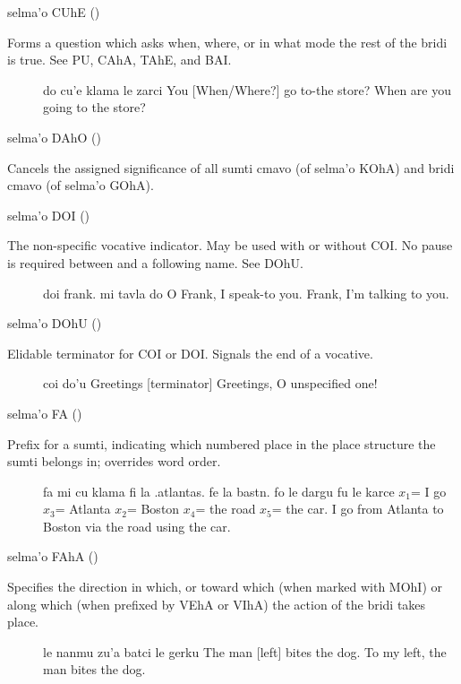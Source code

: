 selma'o CUhE () 

Forms a question which asks when, where, or in what mode the
    rest of the bridi is true. See PU, CAhA, TAhE, and BAI.
\begin{description}
\item[] do cu'e klama le zarci You [When/Where?] go to-the store? When are you going to the store?
\end{description}

selma'o DAhO () 

Cancels the assigned significance of all sumti cmavo (of
    selma'o KOhA) and bridi cmavo (of selma'o GOhA).

selma'o DOI ()

The non-specific vocative indicator. May be used with or
    without COI. No pause is required between  and a
    following name. See DOhU.
\begin{description}
\item[] doi frank. mi tavla do O Frank, I speak-to you. Frank, I'm talking to you.
\end{description}

selma'o DOhU () 

Elidable terminator for COI or DOI. Signals the end of a
    vocative.
\begin{description}
\item[] coi do'u Greetings [terminator] Greetings, O unspecified one!
\end{description}

selma'o FA () 

Prefix for a sumti, indicating which numbered place in the
    place structure the sumti belongs in; overrides word order.
\begin{description}
\item[] fa mi cu klama fi la .atlantas. fe la bastn. fo le dargu fu le karce $x_1$= I go $x_3$= Atlanta $x_2$= Boston $x_4$= the road $x_5$= the car. I go from Atlanta to Boston via the road using the car.
\end{description}

selma'o FAhA () 

Specifies the direction in which, or toward which (when
    marked with MOhI) or along which (when prefixed by VEhA or
    VIhA) the action of the bridi takes place.
\begin{description}
\item[] le nanmu zu'a batci le gerku The man [left] bites the dog. To my left, the man bites the dog.
\end{description}


